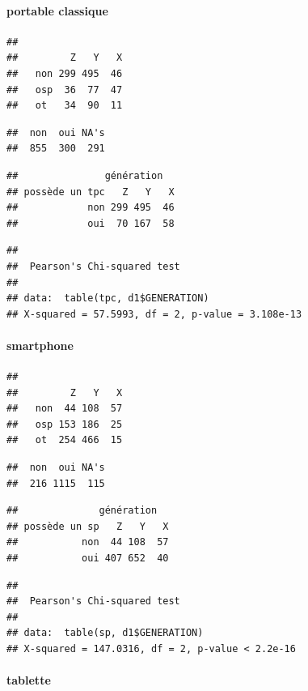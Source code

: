 \documentclass[]{article}
\begin{document}
\paragraph{portable classique}\label{portable-classique}

\begin{verbatim}
##      
##         Z   Y   X
##   non 299 495  46
##   osp  36  77  47
##   ot   34  90  11
\end{verbatim}

\begin{verbatim}
##  non  oui NA's 
##  855  300  291
\end{verbatim}

\begin{verbatim}
##               génération
## possède un tpc   Z   Y   X
##            non 299 495  46
##            oui  70 167  58
\end{verbatim}

\begin{verbatim}
## 
##  Pearson's Chi-squared test
## 
## data:  table(tpc, d1$GENERATION)
## X-squared = 57.5993, df = 2, p-value = 3.108e-13
\end{verbatim}

\paragraph{smartphone}\label{smartphone}

\begin{verbatim}
##      
##         Z   Y   X
##   non  44 108  57
##   osp 153 186  25
##   ot  254 466  15
\end{verbatim}

\begin{verbatim}
##  non  oui NA's 
##  216 1115  115
\end{verbatim}

\begin{verbatim}
##              génération
## possède un sp   Z   Y   X
##           non  44 108  57
##           oui 407 652  40
\end{verbatim}

\begin{verbatim}
## 
##  Pearson's Chi-squared test
## 
## data:  table(sp, d1$GENERATION)
## X-squared = 147.0316, df = 2, p-value < 2.2e-16
\end{verbatim}

\paragraph{tablette}\label{tablette}
\end{document}
